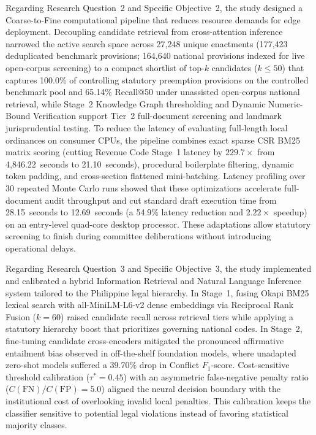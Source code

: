 Regarding Research Question~2 and Specific Objective~2, the study designed a Coarse-to-Fine computational pipeline that reduces resource demands for edge deployment. Decoupling candidate retrieval from cross-attention inference narrowed the active search space across 27,248 unique enactments (177,423 deduplicated benchmark provisions; 164,640 national provisions indexed for live open-corpus screening) to a compact shortlist of top-$k$ candidates ($k \le 50$) that captures 100.0\% of controlling statutory preemption provisions on the controlled benchmark pool and 65.14\% Recall@50 under unassisted open-corpus national retrieval, while Stage~2 Knowledge Graph thresholding and Dynamic Numeric-Bound Verification support Tier~2 full-document screening and landmark jurisprudential testing. To reduce the latency of evaluating full-length local ordinances on consumer CPUs, the pipeline combines exact sparse CSR BM25 matrix scoring (cutting Revenue Code Stage~1 latency by $229.7\times$ from 4,846.22~seconds to 21.10~seconds), procedural boilerplate filtering, dynamic token padding, and cross-section flattened mini-batching. Latency profiling over 30 repeated Monte Carlo runs showed that these optimizations accelerate full-document audit throughput and cut standard draft execution time from 28.15~seconds to 12.69~seconds (a 54.9\% latency reduction and $2.22\times$ speedup) on an entry-level quad-core desktop processor. These adaptations allow statutory screening to finish during committee deliberations without introducing operational delays.

Regarding Research Question~3 and Specific Objective~3, the study implemented and calibrated a hybrid Information Retrieval and Natural Language Inference system tailored to the Philippine legal hierarchy. In Stage~1, fusing Okapi BM25 lexical search with all-MiniLM-L6-v2 dense embeddings via Reciprocal Rank Fusion ($k=60$) raised candidate recall across retrieval tiers while applying a statutory hierarchy boost that prioritizes governing national codes. In Stage~2, fine-tuning candidate cross-encoders mitigated the pronounced affirmative entailment bias observed in off-the-shelf foundation models, where unadapted zero-shot models suffered a 39.70\% drop in Conflict $F_1$-score. Cost-sensitive threshold calibration ($\tau^* = 0.45$) with an asymmetric false-negative penalty ratio ($C(\text{FN})/C(\text{FP}) = 5.0$) aligned the neural decision boundary with the institutional cost of overlooking invalid local penalties. This calibration keeps the classifier sensitive to potential legal violations instead of favoring statistical majority classes.

